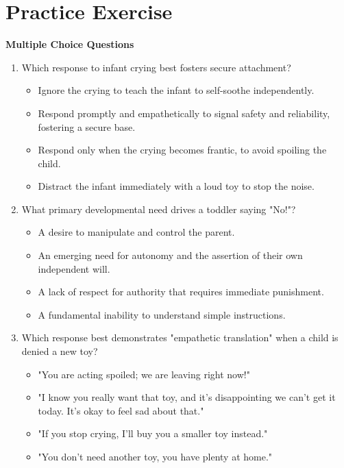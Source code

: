 \section{Practice Exercise}
\begin{practiceexercise}
\textbf{Multiple Choice Questions}
\begin{enumerate}
  \item Which response to infant crying best fosters secure attachment?
    \begin{itemize}
      \item[A)] Ignore the crying to teach the infant to self-soothe independently.
      \item[B)] Respond promptly and empathetically to signal safety and reliability, fostering a secure base.
      \item[C)] Respond only when the crying becomes frantic, to avoid spoiling the child.
      \item[D)] Distract the infant immediately with a loud toy to stop the noise.
    \end{itemize}
  \vspace{\fill}
  \item What primary developmental need drives a toddler saying "No!"?
    \begin{itemize}
      \item[A)] A desire to manipulate and control the parent.
      \item[B)] An emerging need for autonomy and the assertion of their own independent will.
      \item[C)] A lack of respect for authority that requires immediate punishment.
      \item[D)] A fundamental inability to understand simple instructions.
    \end{itemize}
  \vspace{\fill}
  \item Which response best demonstrates "empathetic translation" when a child is denied a new toy?
    \begin{itemize}
      \item[A)] "You are acting spoiled; we are leaving right now!"
      \item[B)] "I know you really want that toy, and it's disappointing we can't get it today. It's okay to feel sad about that."
      \item[C)] "If you stop crying, I'll buy you a smaller toy instead."
      \item[D)] "You don't need another toy, you have plenty at home."
    \end{itemize}
\end{enumerate}
\vspace{\fill}
\newpage


\end{practiceexercise}
